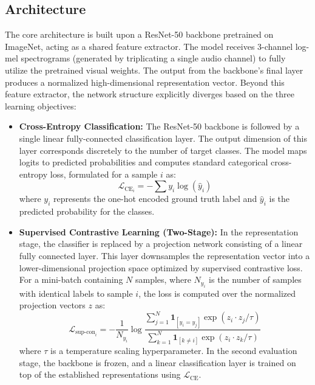 \documentclass[twocolumn, 10pt]{article}
\begin{document}
\subsection{Architecture}
The core architecture is built upon a ResNet-50 backbone \cite{he2016deep} pretrained on ImageNet, acting as a shared feature extractor. The model receives 3-channel log-mel spectrograms (generated by triplicating a single audio channel) to fully utilize the pretrained visual weights. The output from the backbone's final layer produces a normalized high-dimensional representation vector. Beyond this feature extractor, the network structure explicitly diverges based on the three learning objectives:
\begin{itemize}
    \item \textbf{Cross-Entropy Classification:} The ResNet-50 backbone is followed by a single linear fully-connected classification layer. The output dimension of this layer corresponds discretely to the number of target classes. The model maps logits to predicted probabilities and computes standard categorical cross-entropy loss, formulated for a sample $i$ as:
    \begin{equation}
        \mathcal{L}_{\text{CE}_i} = -\sum y_{i} \log(\hat{y}_{i})
    \end{equation}
    where $y_{i}$ represents the one-hot encoded ground truth label and $\hat{y}_{i}$ is the predicted probability for the classes.

    \item \textbf{Supervised Contrastive Learning (Two-Stage):} In the representation stage, the classifier is replaced by a projection network consisting of a linear fully connected layer. This layer downsamples the representation vector into a lower-dimensional projection space optimized by supervised contrastive loss. For a mini-batch containing $N$ samples, where $N_{y_i}$ is the number of samples with identical labels to sample $i$, the loss is computed over the normalized projection vectors $z$ as:
    \begin{equation}
        \mathcal{L}_{\text{sup-con}_i} = -\frac{1}{N_{y_i}} \log \frac{\sum_{j=1}^{N} \mathbf{1}_{[y_i=y_j]} \exp(z_i \cdot z_j / \tau)}{\sum_{k=1}^{N} \mathbf{1}_{[k \neq i]} \exp(z_i \cdot z_k / \tau)}
    \end{equation}
    where $\tau$ is a temperature scaling hyperparameter. In the second evaluation stage, the backbone is frozen, and a linear classification layer is trained on top of the established representations using $\mathcal{L}_{\text{CE}}$.


\end{itemize}
\end{document}
